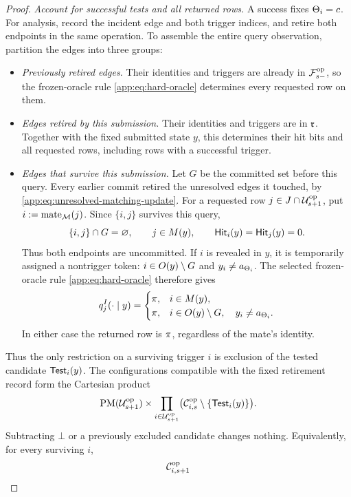 \begin{proof}
\emph{Account for successful tests and all returned rows.}
A success fixes \(\TriggerIndex{i}=c\).  For analysis, record the incident
edge and both trigger indices, and retire both endpoints in the same
operation.  To assemble the entire query observation, partition the edges
into three groups:
\begin{itemize}
\item \emph{Previously retired edges.}
Their identities and triggers are already in \(\OpAnalyticField{s}\), so the
frozen-oracle rule \eqref{app:eq:hard-oracle} determines every requested
row on them.
\item \emph{Edges retired by this submission.}
Their identities and triggers are in \(\RetiredRecordValue\).  Together
with the fixed submitted state \(y\), this determines their hit bits and
all requested rows, including rows with a successful trigger.
\item \emph{Edges that survive this submission.}
Let \(G\) be the committed set before this query. Every earlier commit
retired the unresolved edges it touched, by
\cref{app:eq:unresolved-matching-update}.
For a requested row \(j\in J\cap\OpUnresolvedVertices{s+1}\), put
\(i:=\MateInMatching{j}\). Since \(\{i,j\}\) survives this query,
\[
 \{i,j\}\cap G=\varnothing,
 \qquad j\in\MaskSet{y},
 \qquad \HardHit{y}{i}=\HardHit{y}{j}=0.
\]
Thus both endpoints are uncommitted. If \(i\) is revealed in \(y\),
it is temporarily assigned a nontrigger token:
\(i\in\ObservedSet{y}\setminus G\) and
\(y_i\ne\HardCandidate{\TriggerIndex{i}}\).
The selected frozen-oracle rule \eqref{app:eq:hard-oracle} therefore gives
\[
 \HardOracleRow{I}{y}{j}=
 \begin{cases}
  \HardMarginal,&i\in\MaskSet{y},\\
  \HardMarginal,&i\in\ObservedSet{y}\setminus G,
       \quad y_i\ne\HardCandidate{\TriggerIndex{i}}.
 \end{cases}
\]
In either case the returned row is \(\HardMarginal\), regardless of
the mate's identity.
\end{itemize}
Thus the only restriction on a surviving trigger \(i\) is exclusion of
the tested candidate \(\HardTest{y}{i}\). The configurations compatible
with the fixed retirement record form the Cartesian product
\[
 \operatorname{PM}(\OpUnresolvedVertices{s+1})
 \times
 \prod_{i\in\OpUnresolvedVertices{s+1}}
   \bigl(\OpRemainingTriggers{i}{s}\setminus\{\HardTest{y}{i}\}\bigr).
\]
Subtracting \(\bot\) or a previously excluded candidate changes nothing.
Equivalently, for every surviving \(i\),
\[
 \OpRemainingTriggers{i}{s+1}
\]
\end{proof}
